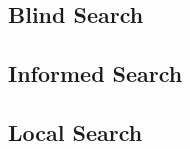 \subsection{Blind Search}
\label{cha::lit::search::blind}

\subsection{Informed Search}
\label{cha::lit::search::informed}

\subsection{Local Search}
\label{cha::lit::search::local}

